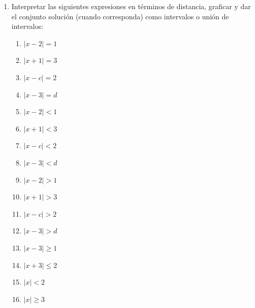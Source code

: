 \documentclass[12pt]{article}
\theoremstyle{definition}
\begin{document}
\begin{enumerate}
\item  Interpretar las siguientes expresiones en términos de distancia, graficar y dar el conjunto solución (cuando corresponda) como intervalos o unión de  intervalos:
\begin{multicols}{4}
\begin{enumerate}
\setlength\itemsep{0em}
\item $|x-2| = 1$
\item $|x+1| = 3$
\item $|x-c| = 2$
\item $|x-3| = d$
\item $|x-2| < 1$
\item $|x+1| < 3$
\item $|x-c| < 2$
\item $|x-3| < d$
\item $|x-2| > 1$
\item $|x+1| > 3$
\item $|x-c| > 2$
\item $|x-3| > d$
\item $|x-3| \geq 1$
\item $|x+3| \leq 2$
\item $|x| < 2$
\item $|x| \geq 3$
\end{enumerate}
\end{multicols}



\end{enumerate}
\end{document}
